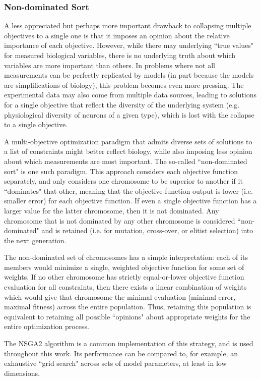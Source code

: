 \subsubsection{Non-dominated Sort} A less appreciated but perhaps more important drawback to collapsing multiple objectives to a single one is that it imposes an opinion about the relative importance of each objective.
However, while there may underlying ``true values" for measured biological variables, there is no underlying truth about which variables are more important than others.
In problems where not all measurements can be perfectly replicated by models (in part because the models are simplifications of biology), this problem becomes even more pressing.
The experimental data may also come from multiple data sources, leading to solutions for a single objective that reflect the diversity of the underlying system (e.g. physiological diversity of neurons of a given type), which is lost with the collapse to a single objective.

A multi-objective optimization paradigm that admits diverse sets of solutions to a list of constraints might better reflect biology, while also imposing less opinion about which measurements are most important.
The so-called ``non-dominated sort" is one such paradigm.
This approach considers each objective function separately, and only considers one chromosome to be superior to another if it ``dominates" that other, meaning that the objective function output is lower (i.e. smaller error) for each objective function.
If even a single objective function has a larger value for the latter chromosome, then it is not dominated.  Any chromosome that is not dominated by any other chromosome is considered ``non-dominated" and is retained (i.e. for mutation, cross-over, or elitist selection) into the next generation.

The non-dominated set of chromosomes has a simple interpretation: each of its members would minimize a single, weighted objective function for some set of weights.
If no other chromosome has strictly equal-or-lower objective function evaluation for all constraints, then there exists a linear combination of weights which would give that chromosome the minimal evaluation (minimal error, maximal fitness) across the entire population.
Thus, retaining this population is equivalent to retaining all possible ``opinions" about appropriate weights for the entire optimization process.

The NSGA2 algorithm \citep{deb2000fast} is a common implementation of this strategy, and is used throughout this work. Its performance can be compared to, for example, an exhaustive ``grid search" across sets of model parameters, at least in low dimensions.  

